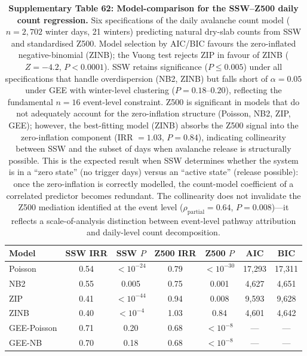 \documentclass[11pt,letterpaper]{article}
\begin{document}
\begin{table}[!ht]
\centering
\caption{\textbf{Supplementary Table 62: Model-comparison for the SSW--Z500 daily count regression.}
Six specifications of the daily avalanche count model ($n = 2{,}702$ winter days, 21 winters) predicting natural dry-slab counts from SSW and standardised Z500. Model selection by AIC/BIC favours the zero-inflated negative-binomial (ZINB); the Vuong test rejects ZIP in favour of ZINB ($Z = -4.2$, $P < 0.0001$). SSW retains significance ($P \leq 0.005$) under all specifications that handle overdispersion (NB2, ZINB) but falls short of $\alpha = 0.05$ under GEE with winter-level clustering ($P = 0.18$--$0.20$), reflecting the fundamental $n = 16$ event-level constraint. Z500 is significant in models that do not adequately account for the zero-inflation structure (Poisson, NB2, ZIP, GEE); however, the best-fitting model (ZINB) absorbs the Z500 signal into the zero-inflation component (IRR $= 1.03$, $P = 0.84$), indicating collinearity between SSW and the subset of days when avalanche release is structurally possible. This is the expected result when SSW determines whether the system is in a ``zero state'' (no trigger days) versus an ``active state'' (release possible): once the zero-inflation is correctly modelled, the count-model coefficient of a correlated predictor becomes redundant. The collinearity does not invalidate the Z500 mediation identified at the event level ($\rho_{\mathrm{partial}} = 0.64$, $P = 0.008$)---it reflects a scale-of-analysis distinction between event-level pathway attribution and daily-level count decomposition.}
\label{tab:nb_comparison}
\small
\begin{tabular}{lcccccc}
\toprule
Model & SSW IRR & SSW $P$ & Z500 IRR & Z500 $P$ & AIC & BIC \\
\midrule
Poisson & 0.54 & $< 10^{-24}$ & 0.79 & $< 10^{-30}$ & 17{,}293 & 17{,}311 \\
NB2 & 0.55 & 0.005 & 0.75 & 0.001 & 4{,}627 & 4{,}651 \\
ZIP & 0.41 & $< 10^{-44}$ & 0.94 & 0.008 & 9{,}593 & 9{,}628 \\
ZINB & 0.40 & $< 10^{-4}$ & 1.03 & 0.84 & 4{,}601 & 4{,}642 \\
GEE-Poisson & 0.71 & 0.20 & 0.68 & $< 10^{-8}$ & --- & --- \\
GEE-NB & 0.70 & 0.18 & 0.68 & $< 10^{-8}$ & --- & --- \\
\bottomrule
\end{tabular}
\end{table}
\end{document}
